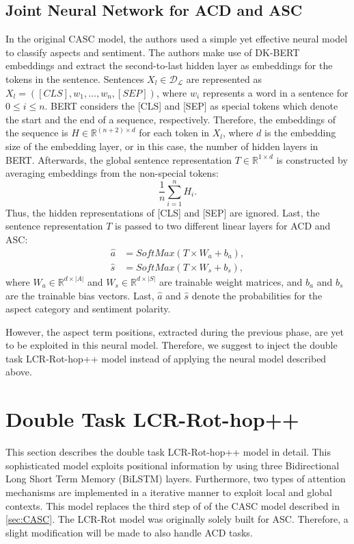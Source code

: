 \documentclass[american, oneside]{ecsgdp}
\begin{document}
\subsection{Joint Neural Network for ACD and ASC} %
In the original CASC model, the authors used a simple yet effective neural model to classify aspects and sentiment. The authors make use of DK-BERT embeddings and extract the second-to-last hidden layer as embeddings for the tokens in the sentence. Sentences $X_l \in \mathcal{D_\mathcal{L}}$ are represented as $X_l = \left ( [CLS], w_1, \ldots, w_n, [SEP] \right )$, where $w_i$ represents a word in a sentence for $0 \leq i \leq n$. BERT considers the [CLS] and [SEP] as special tokens which denote the start and the end of a sequence, respectively. Therefore, the embeddings of the sequence is $H \in \mathbb{R}^{(n+2) \times d}$ for each token in $X_l$, where $d$ is the embedding size of the embedding layer, or in this case, the number of hidden layers in BERT. Afterwards, the global sentence representation $T \in \mathbb{R}^{1 \times d}$ is constructed by averaging embeddings from the non-special tokens: 
\begin{equation} 
    \frac{1}{n} \sum_{i=1}^{n}H_i. 
\end{equation}
Thus, the hidden representations of [CLS] and [SEP] are ignored. Last, the sentence representation $T$ is passed to two different linear layers for ACD and ASC: 
\begin{align}
    \hat{a} & = SoftMax(T \times W_a + b_a), \\
    \hat{s} & = SoftMax(T \times W_s + b_s),
\end{align}
where $W_a \in \mathbb{R}^{d \times \lvert A \rvert}$ and $W_s \in \mathbb{R}^{d \times \lvert S \rvert}$ are trainable weight matrices, and $b_a$ and $b_s$ are the trainable bias vectors. Last, $\hat{a}$ and  $\hat{s}$ denote the probabilities for the aspect category and sentiment polarity. 

\begin{figure}[htbp]
  \centering
  
  \caption{}
  \label{fig:simple_neural}
\end{figure}

However, the aspect term positions, extracted during the previous phase, are yet to be exploited in this neural model. Therefore, we suggest to inject the double task LCR-Rot-hop++ model instead of applying the neural model described above. 

\section{Double Task LCR-Rot-hop++} \label{sec:LCR-Rot}
This section describes the double task LCR-Rot-hop++ model \parencite{Trusca2020HAABSA++} in detail. This sophisticated model exploits positional information by using three Bidirectional Long Short Term Memory (BiLSTM) layers. Furthermore, two types of attention mechanisms are implemented in a iterative manner to exploit local and global contexts. This model replaces the third step of of the CASC model described in \cref{sec:CASC}. The LCR-Rot model was originally solely built for ASC. Therefore, a slight modification will be made to also handle ACD tasks.
\end{document}
